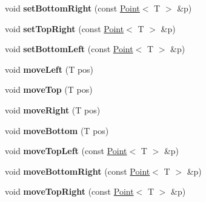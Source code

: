 \begin{DoxyCompactItemize}
\item 
\hypertarget{class_box_adbec284811aeec462e064a28f7aaaa8c}{
void {\bfseries setBottomRight} (const \hyperlink{class_point}{Point}$<$ T $>$ \&p)}
\label{class_box_adbec284811aeec462e064a28f7aaaa8c}

\item 
\hypertarget{class_box_a87df2c9be2d8d144df1e47e1150b9132}{
void {\bfseries setTopRight} (const \hyperlink{class_point}{Point}$<$ T $>$ \&p)}
\label{class_box_a87df2c9be2d8d144df1e47e1150b9132}

\item 
\hypertarget{class_box_a228cf7f5dcfd1013b647d524a4ce5148}{
void {\bfseries setBottomLeft} (const \hyperlink{class_point}{Point}$<$ T $>$ \&p)}
\label{class_box_a228cf7f5dcfd1013b647d524a4ce5148}

\item 
\hypertarget{class_box_aa656edcbbfa8c22092bc2928e792db93}{
void {\bfseries moveLeft} (T pos)}
\label{class_box_aa656edcbbfa8c22092bc2928e792db93}

\item 
\hypertarget{class_box_a082c2eb93743c2bb2e8d2873a110bdb6}{
void {\bfseries moveTop} (T pos)}
\label{class_box_a082c2eb93743c2bb2e8d2873a110bdb6}

\item 
\hypertarget{class_box_a224e6b7f6da28d3e72d8abac92d0559f}{
void {\bfseries moveRight} (T pos)}
\label{class_box_a224e6b7f6da28d3e72d8abac92d0559f}

\item 
\hypertarget{class_box_a5a5a2ff82018b2b385ed3ad222b081e4}{
void {\bfseries moveBottom} (T pos)}
\label{class_box_a5a5a2ff82018b2b385ed3ad222b081e4}

\item 
\hypertarget{class_box_a25f13cb4c83114b15caa2d62675137bb}{
void {\bfseries moveTopLeft} (const \hyperlink{class_point}{Point}$<$ T $>$ \&p)}
\label{class_box_a25f13cb4c83114b15caa2d62675137bb}

\item 
\hypertarget{class_box_ae5103f2b496ac2f10105c41a336ec088}{
void {\bfseries moveBottomRight} (const \hyperlink{class_point}{Point}$<$ T $>$ \&p)}
\label{class_box_ae5103f2b496ac2f10105c41a336ec088}

\item 
\hypertarget{class_box_a13e447ff3e86e55f6cd66cd74a0d0c7a}{
void {\bfseries moveTopRight} (const \hyperlink{class_point}{Point}$<$ T $>$ \&p)}
\label{class_box_a13e447ff3e86e55f6cd66cd74a0d0c7a}


\end{DoxyCompactItemize}
